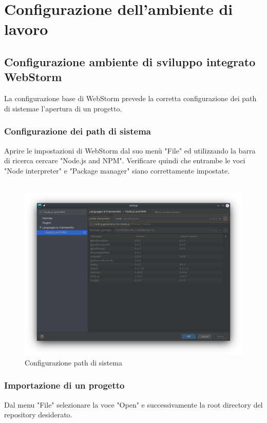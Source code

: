 \section{Configurazione dell'ambiente di lavoro}
\subsection{Configurazione ambiente di sviluppo integrato WebStorm}
La configurazione base di WebStorm prevede la corretta configurazione dei path di sistema\glosp e l'apertura di un progetto.
\subsubsection{Configurazione dei path di sistema}
Aprire le impostazioni di WebStorm dal suo menù "File" ed utilizzando la barra di ricerca cercare "Node.js and NPM". Verificare quindi che entrambe le voci "Node interpreter" e "Package manager" siano correttamente impostate.
\\
\\
\begin{figure}[H] 	
	\begin{center}
		\includegraphics[width=\textwidth,height=\textheight,keepaspectratio]{img/node-npm.png}
	\end{center}
	\caption{Configurazione path di sistema}	
\end{figure}
\subsubsection{Importazione di un progetto}
Dal menu "File" selezionare la voce "Open" e successivamente la root directory del repository desiderato.

